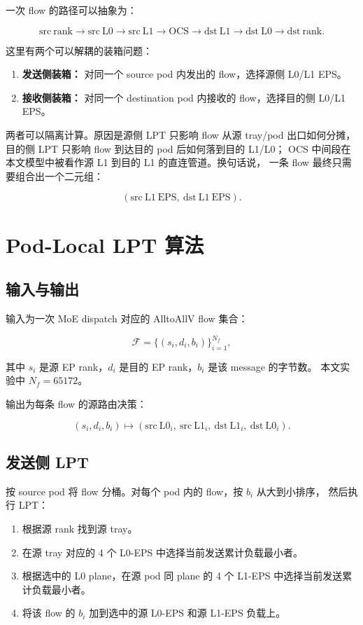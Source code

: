 \documentclass[UTF8,a4paper,11pt,fontset=none]{ctexart}
\begin{document}
一次 flow 的路径可以抽象为：

\[
  \mathrm{src\ rank}
  \rightarrow \mathrm{src\ L0}
  \rightarrow \mathrm{src\ L1}
  \rightarrow \mathrm{OCS}
  \rightarrow \mathrm{dst\ L1}
  \rightarrow \mathrm{dst\ L0}
  \rightarrow \mathrm{dst\ rank}.
\]

这里有两个可以解耦的装箱问题：

\begin{enumerate}
  \item \textbf{发送侧装箱：} 对同一个 source pod 内发出的 flow，选择源侧 L0/L1 EPS。
  \item \textbf{接收侧装箱：} 对同一个 destination pod 内接收的 flow，选择目的侧 L0/L1 EPS。
\end{enumerate}

两者可以隔离计算。原因是源侧 LPT 只影响 flow 从源 tray/pod 出口如何分摊，
目的侧 LPT 只影响 flow 到达目的 pod 后如何落到目的 L1/L0；
OCS 中间段在本文模型中被看作源 L1 到目的 L1 的直连管道。换句话说，
一条 flow 最终只需要组合出一个二元组：

\[
  ( \mathrm{src\ L1\ EPS},\ \mathrm{dst\ L1\ EPS} ).
\]

\section{Pod-Local LPT 算法}

\subsection{输入与输出}

输入为一次 MoE dispatch 对应的 AlltoAllV flow 集合：

\[
  \mathcal{F} = \{(s_i, d_i, b_i)\}_{i=1}^{N_f},
\]

其中 $s_i$ 是源 EP rank，$d_i$ 是目的 EP rank，$b_i$ 是该 message 的字节数。
本文实验中 $N_f=65172$。

输出为每条 flow 的源路由决策：

\[
  (s_i, d_i, b_i) \mapsto
  (\mathrm{src\ L0}_i,\ \mathrm{src\ L1}_i,\ \mathrm{dst\ L1}_i,\ \mathrm{dst\ L0}_i).
\]

\subsection{发送侧 LPT}

按 source pod 将 flow 分桶。对每个 pod 内的 flow，按 $b_i$ 从大到小排序，
然后执行 LPT：

\begin{enumerate}
  \item 根据源 rank 找到源 tray。
  \item 在源 tray 对应的 4 个 L0-EPS 中选择当前发送累计负载最小者。
  \item 根据选中的 L0 plane，在源 pod 同 plane 的 4 个 L1-EPS 中选择当前发送累计负载最小者。
  \item 将该 flow 的 $b_i$ 加到选中的源 L0-EPS 和源 L1-EPS 负载上。
\end{enumerate}
\end{document}
